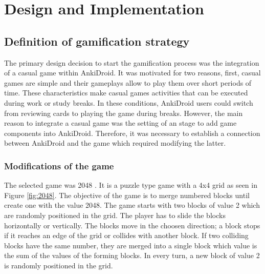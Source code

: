 
\chapter{Design and Implementation} %

\label{desi} %


\section{Definition of gamification strategy}

The primary design decision to start the gamification process was the integration of a casual game within AnkiDroid. It was motivated for two reasons, first, casual games are simple and their gameplays allow to play them over short periods of time. These characteristics make casual games activities that can be executed during work or study breaks. In these conditions, AnkiDroid users could switch from reviewing cards to playing the game during breaks. However, the main reason to integrate a casual game was the setting of an stage to add game components into AnkiDroid. Therefore, it was necessary to establish a connection between AnkiDroid and the game which required modifying the latter.

\subsection{Modifications of the game}
The selected game was 2048 \citep{uberspot2017game}. It is a puzzle type game with a 4x4 grid as seen in Figure \ref{fig:2048}. The objective of the game is to merge numbered blocks until create one with the value 2048. The game starts with two blocks of value 2 which are randomly positioned in the grid. The player has to slide the blocks horizontally or vertically. The blocks move in the choosen direction; a block stops if it reaches an edge of the grid or collides with another block. If two colliding blocks have the same number, they are merged into a single block which value is the sum of the values of the forming blocks. In every turn, a new block of value 2 is randomly positioned in the grid.

